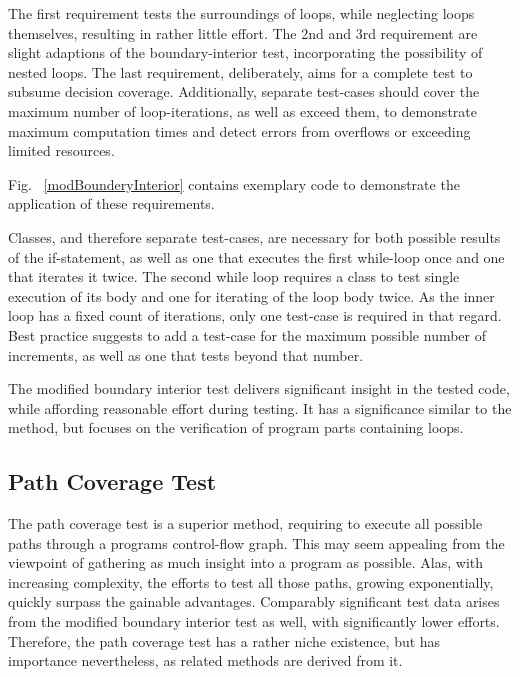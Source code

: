 		The first requirement tests the surroundings of loops, while neglecting loops themselves, resulting in rather little effort. The 2nd and 3rd requirement are slight adaptions of the boundary-interior test, incorporating the possibility of nested loops. The last requirement, deliberately, aims for a complete test to subsume decision coverage. Additionally, separate test-cases should cover the maximum number of loop-iterations, as well as exceed them, to demonstrate maximum computation times and detect errors from overflows or exceeding limited resources. 
		
		Fig. ~\ref{modBounderyInterior} contains exemplary code to demonstrate the application of these requirements.
		
		
		Classes, and therefore separate test-cases, are necessary for both possible results of the if-statement, as well as one that executes the first while-loop once and one that iterates it twice. The second while loop requires a class to test single execution of its body and one for iterating of the loop body twice. As the inner loop has a fixed count of iterations, only one test-case is required in that regard. Best practice suggests to add a test-case for the maximum possible number of increments, as well as one that tests beyond that number.

		The modified boundary interior test delivers significant insight in the tested code, while affording reasonable effort during testing. It has a significance similar to the \mcdc method, but focuses on the verification of program parts containing loops. 
		
	\subsection{Path Coverage Test}
		The path coverage test is a superior method, requiring to execute all possible paths through a programs control-flow graph. This may seem appealing from the viewpoint of gathering as much insight into a program as possible. Alas, with increasing complexity, the efforts to test all those paths, growing exponentially, quickly surpass the gainable advantages. Comparably significant test data arises from the modified boundary interior test as well, with significantly lower efforts. Therefore, the path coverage test has a rather niche existence, but has importance nevertheless, as related methods are derived from it.
		
